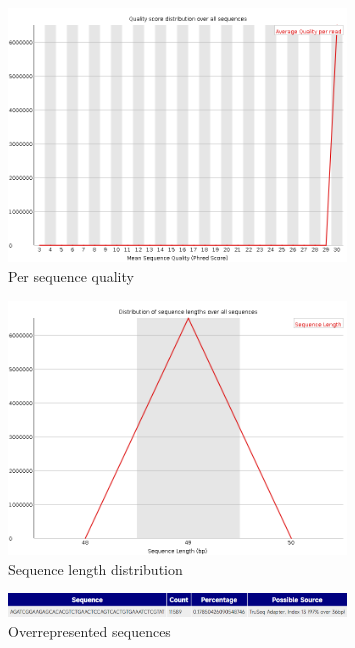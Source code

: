 \documentclass[UTF8]{ctexart}
\begin{document}
\begin{figure}[!htb]
	\centering
	\includegraphics[width=0.8\textwidth]{img/SRR14325859_FastQC_Origin_img/per_sequence_quality.png}	%
	\caption{Per sequence quality\protect}    %
\end{figure}

\begin{figure}[!htb]
	\centering
	\includegraphics[width=0.8\textwidth]{img/SRR14325859_FastQC_Origin_img/sequence_length_distribution.png}	%
	\caption{Sequence length distribution\protect}    %
\end{figure}

\begin{figure}[!htb]
	\centering
	\includegraphics[width=0.8\textwidth]{img/SRR14325859_FastQC_Origin_img/overrepresented_sequences.png}	%
	\caption{Overrepresented sequences\protect}    %
\end{figure}
\end{document}
